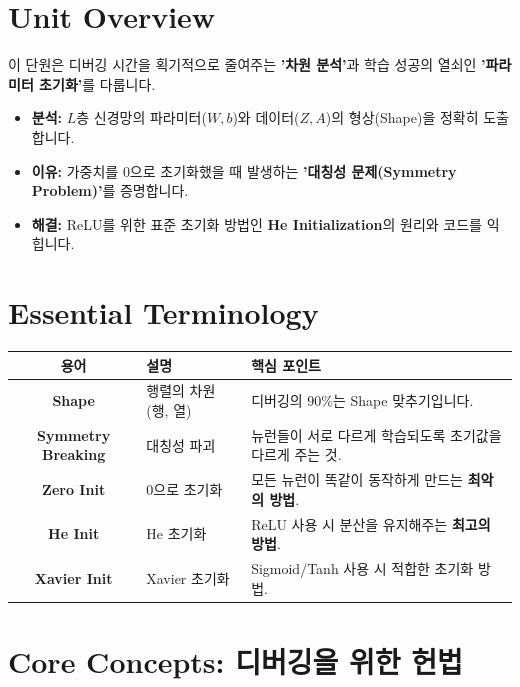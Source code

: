 \documentclass[11pt,a4paper]{book}
\theoremstyle{definition}
\begin{document}
\section{Unit Overview}
\begin{summarybox}[title={핵심 목표}]
이 단원은 디버깅 시간을 획기적으로 줄여주는 \textbf{'차원 분석'}과 학습 성공의 열쇠인 \textbf{'파라미터 초기화'}를 다룹니다.
\begin{itemize}
    \item \textbf{분석:} $L$층 신경망의 파라미터($W, b$)와 데이터($Z, A$)의 형상(Shape)을 정확히 도출합니다.
    \item \textbf{이유:} 가중치를 0으로 초기화했을 때 발생하는 \textbf{'대칭성 문제(Symmetry Problem)'}를 증명합니다.
    \item \textbf{해결:} ReLU를 위한 표준 초기화 방법인 \textbf{He Initialization}의 원리와 코드를 익힙니다.
\end{itemize}
\end{summarybox}

\section{Essential Terminology}
\begin{center}
\begin{tabular}{|c|l|l|}
\hline
\textbf{용어} & \textbf{설명} & \textbf{핵심 포인트} \\ \hline
\textbf{Shape} & 행렬의 차원 (행, 열) & 디버깅의 90\%는 Shape 맞추기입니다. \\ \hline
\textbf{Symmetry Breaking} & 대칭성 파괴 & 뉴런들이 서로 다르게 학습되도록 초기값을 다르게 주는 것. \\ \hline
\textbf{Zero Init} & 0으로 초기화 & 모든 뉴런이 똑같이 동작하게 만드는 \textbf{최악의 방법}. \\ \hline
\textbf{He Init} & He 초기화 & ReLU 사용 시 분산을 유지해주는 \textbf{최고의 방법}. \\ \hline
\textbf{Xavier Init} & Xavier 초기화 & Sigmoid/Tanh 사용 시 적합한 초기화 방법. \\ \hline
\end{tabular}
\end{center}

\section{Core Concepts: 디버깅을 위한 헌법}
\end{document}
